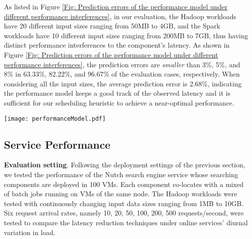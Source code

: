 \documentclass[10pt, conference, compsocconf]{IEEEtran}
\begin{document}
As listed in Figure \ref{Fig: Prediction errors of the performance model under different performance interferences}, in our evaluation, the Hadoop workloads have 20 different input sizes ranging from 50MB to 4GB, and the Spark workloads have 10 different input sizes ranging from 200MB to 7GB, thus having distinct performance interferences to the component's latency. As shown in Figure \ref{Fig: Prediction errors of the performance model under different performance interferences}, the prediction errors are \emph{smaller} than 3\%, 5\%, and 8\% in 63.33\%, 82.22\%, and 96.67\% of the evaluation cases, respectively. When considering all the input sizes, the average prediction error is 2.68\%, indicating the performance model keeps a good track of the observed latency and it is sufficient for our scheduling heuristic to achieve a near-optimal performance.



\begin{figure*}
\centering
  \texttt{[image: performanceModel.pdf]}\\
  \caption{Prediction errors of the performance model under different performance interferences}
  \label{Fig: Prediction errors of the performance model under different performance interferences}
\end{figure*}














\subsection{Service Performance} \label{Section: Service Performance}
\textbf{Evaluation setting}. Following the deployment settings of the previous section, we tested the performance of the Nutch search engine service whose searching components are deployed in 100 VMs. Each component co-locates with a mixed of batch jobs running on VMs of the same node. The Hadoop workloads were tested with continuously changing input data sizes ranging from 1MB to 10GB. Six request arrival rates, namely 10, 20, 50, 100, 200, 500 requests/second, were tested to compare the latency reduction techniques under online services' diurnal variation in load.
\end{document}
